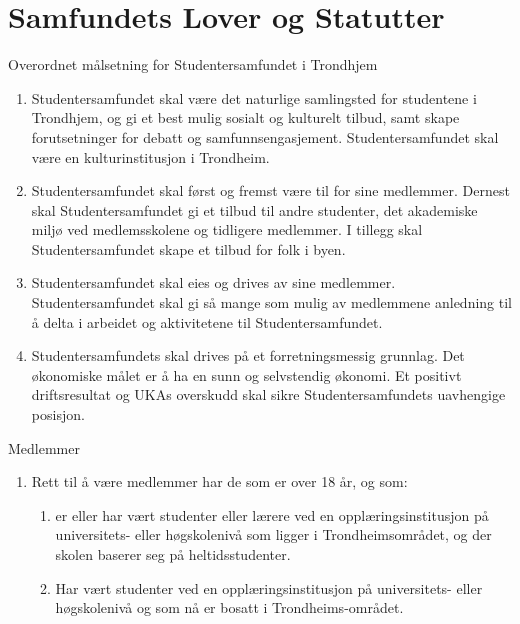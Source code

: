 
\chapter*{Samfundets Lover og Statutter}

\begin{lovkapittel}{}

\begin{lovparagraf}{Overordnet målsetning for Studentersamfundet i Trondhjem}

    \begin{enumerate}
        \item Studentersamfundet skal være det naturlige samlingsted for studentene i Trondhjem, og gi
            et best mulig sosialt og kulturelt tilbud, samt skape forutsetninger for debatt og
            samfunnsengasjement. Studentersamfundet skal være en kulturinstitusjon i Trondheim.
        \item Studentersamfundet skal først og fremst være til for sine medlemmer. Dernest
            skal Studentersamfundet gi et tilbud til andre studenter, det akademiske miljø
            ved medlemsskolene og tidligere medlemmer. I tillegg skal Studentersamfundet
            skape et tilbud for folk i byen.
	\item Studentersamfundet skal eies og drives av sine medlemmer. Studentersamfundet skal gi så mange som mulig 
	av medlemmene anledning til å delta i arbeidet og aktivitetene til Studentersamfundet.
	\item Studentersamfundets skal drives på et forretningsmessig grunnlag. Det økonomiske målet er å ha en sunn og 
	selvstendig økonomi. Et positivt driftsresultat og UKAs overskudd skal sikre Studentersamfundets
	uavhengige posisjon.

    \end{enumerate}
\end{lovparagraf}





\begin{lovparagraf}{Medlemmer}

  \begin{enumerate}
    \item Rett til å være medlemmer har de som er over 18 år, og som:
      
      \begin{enumerate}
      \item er eller har vært studenter eller lærere ved en opplæringsinstitusjon på universitets- eller høgskolenivå
      som ligger i Trondheimsområdet, og der skolen baserer seg på heltidsstudenter.
      \item Har vært studenter ved en opplæringsinstitusjon på universitets- eller høgskolenivå og som nå er bosatt i
      Trondheims-området.
      \end{enumerate}
      

\end{enumerate}
\end{lovparagraf}
\end{lovkapittel}
